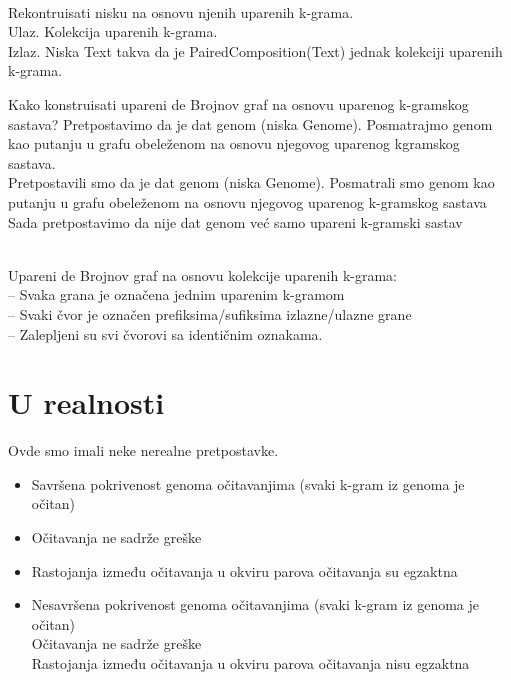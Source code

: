 \begin{problem} 
	~\\ Rekontruisati nisku na osnovu njenih uparenih k-grama.
	\\ Ulaz. Kolekcija uparenih k-grama.
	\\ Izlaz. Niska Text takva da je PairedComposition(Text) jednak kolekciji uparenih k-grama. 
\end{problem}

Kako konstruisati upareni de Brojnov graf na osnovu uparenog k-gramskog sastava?
Pretpostavimo da je dat genom (niska Genome). Posmatrajmo genom kao putanju u grafu obeleženom na osnovu njegovog uparenog kgramskog sastava.
\\
Pretpostavili smo da je dat genom (niska Genome). Posmatrali smo genom kao putanju u grafu obeleženom na osnovu njegovog uparenog k-gramskog sastava
\\
Sada pretpostavimo da nije dat genom već samo upareni k-gramski sastav


~\\ Upareni de Brojnov graf na osnovu kolekcije uparenih k-grama:
\\ – Svaka grana je označena jednim uparenim k-gramom
\\ – Svaki čvor je označen prefiksima/sufiksima izlazne/ulazne grane
\\ – Zalepljeni su svi čvorovi sa identičnim oznakama.

\section{U realnosti}

Ovde smo imali neke nerealne pretpostavke.
\begin{itemize}
	\item  Savršena pokrivenost genoma očitavanjima (svaki k-gram iz genoma je očitan)
	\item Očitavanja ne sadrže greške
	\item Rastojanja između očitavanja u okviru parova očitavanja su egzaktna
	\item Nesavršena pokrivenost genoma očitavanjima (svaki k-gram iz genoma je očitan)
	\\ Očitavanja ne sadrže greške
	\\ Rastojanja između očitavanja u okviru parova očitavanja nisu egzaktna
\end{itemize}

